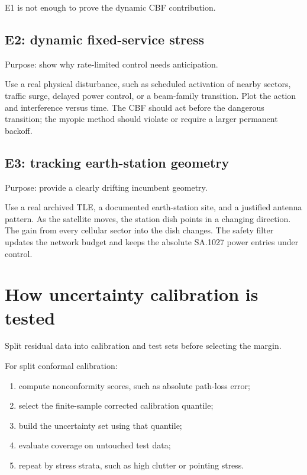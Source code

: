 \documentclass[11pt]{article}
\begin{document}
E1 is not enough to prove the dynamic CBF contribution.

\subsection{E2: dynamic fixed-service stress}

Purpose: show why rate-limited control needs anticipation.

Use a real physical disturbance, such as scheduled activation of nearby sectors, traffic surge, delayed power control, or a beam-family transition. Plot the action and interference versus time. The CBF should act before the dangerous transition; the myopic method should violate or require a larger permanent backoff.

\subsection{E3: tracking earth-station geometry}

Purpose: provide a clearly drifting incumbent geometry.

Use a real archived TLE, a documented earth-station site, and a justified antenna pattern. As the satellite moves, the station dish points in a changing direction. The gain from every cellular sector into the dish changes. The safety filter updates the network budget and keeps the absolute SA.1027 power entries under control.

\section{How uncertainty calibration is tested}

Split residual data into calibration and test sets before selecting the margin.

For split conformal calibration:

\begin{enumerate}
\item compute nonconformity scores, such as absolute path-loss error;
\item select the finite-sample corrected calibration quantile;
\item build the uncertainty set using that quantile;
\item evaluate coverage on untouched test data;
\item repeat by stress strata, such as high clutter or pointing stress.
\end{enumerate}
\end{document}
